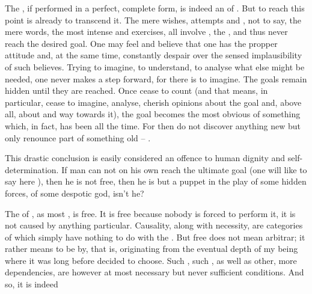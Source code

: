 \pa The \sch, if performed in a perfect, complete form, is indeed an
 of .  But to reach this point is already to
transcend it.  The mere wishes, attempts and
, not to say, the mere words, the most intense and 
 exercises, all
involve , the , and thus never reach the desired goal.  One may feel and
believe that one has the propper attitude and, at the same time,
constantly despair over the sensed implausibility of such believes. 
Trying to imagine, to understand, to analyse what else might be
needed, one never makes a step forward, for there is  to
imagine.  The goals remain hidden until they are reached.  Once 
cease to count (and that means, in particular, cease to imagine,
analyse, cherish opinions about the  goal and, above
all, about  and  way towards it), the goal becomes
the most obvious  of something which, in fact, has been
 all the time.  For then  do not discover anything
new but only renounce part of something old -- .

\pa
{}
This drastic conclusion is easily considered an offence to human dignity and
self-determination. If man can not on his own reach the ultimate goal (one
will like to say here ), then he is not free, then he is
but a puppet in the play of some hidden forces, of some despotic god, isn't he?

The  of \sch, as most , is free.
It is free because nobody is forced to perform it, 
it is not caused by anything particular. Causality, along with
necessity, are categories of  which simply have nothing to
do with the . But free does not mean arbitrar; it rather means
to be  by, that is, originating from the eventual depth of my being
where it was  long before  decided to choose. 
Such , such , as well as other, more 
dependencies, are however at most necessary but never sufficient
conditions. And so, it is indeed 

